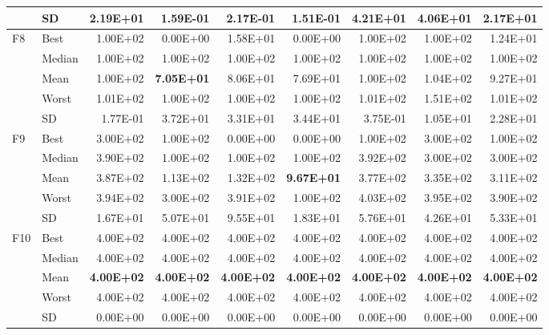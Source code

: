 \documentclass[algorithms,article,submit,moreauthors,pdftex]{Definitions/mdpi}
\newcommand{\bestval}[1]{\textbf{#1}}
\begin{document}
\begin{table}[p]
{\begin{tabular}{llrrrrrrr}
 & SD & 2.19E+01 & 1.59E-01 & 2.17E-01 & 1.51E-01 & 4.21E+01 & 4.06E+01 & 2.17E+01 \\
\midrule
F8 & Best & 1.00E+02 & 0.00E+00 & 1.58E+01 & 0.00E+00 & 1.00E+02 & 1.00E+02 & 1.24E+01 \\
 & Median & 1.00E+02 & 1.00E+02 & 1.00E+02 & 1.00E+02 & 1.00E+02 & 1.00E+02 & 1.00E+02 \\
 & Mean & 1.00E+02 & \bestval{7.05E+01} & 8.06E+01 & 7.69E+01 & 1.00E+02 & 1.04E+02 & 9.27E+01 \\
 & Worst & 1.01E+02 & 1.00E+02 & 1.00E+02 & 1.00E+02 & 1.01E+02 & 1.51E+02 & 1.01E+02 \\
 & SD & 1.77E-01 & 3.72E+01 & 3.31E+01 & 3.44E+01 & 3.75E-01 & 1.05E+01 & 2.28E+01 \\
\midrule
F9 & Best & 3.00E+02 & 1.00E+02 & 0.00E+00 & 0.00E+00 & 1.00E+02 & 3.00E+02 & 1.00E+02 \\
 & Median & 3.90E+02 & 1.00E+02 & 1.00E+02 & 1.00E+02 & 3.92E+02 & 3.00E+02 & 3.00E+02 \\
 & Mean & 3.87E+02 & 1.13E+02 & 1.32E+02 & \bestval{9.67E+01} & 3.77E+02 & 3.35E+02 & 3.11E+02 \\
 & Worst & 3.94E+02 & 3.00E+02 & 3.91E+02 & 1.00E+02 & 4.03E+02 & 3.95E+02 & 3.90E+02 \\
 & SD & 1.67E+01 & 5.07E+01 & 9.55E+01 & 1.83E+01 & 5.76E+01 & 4.26E+01 & 5.33E+01 \\
\midrule
F10 & Best & 4.00E+02 & 4.00E+02 & 4.00E+02 & 4.00E+02 & 4.00E+02 & 4.00E+02 & 4.00E+02 \\
 & Median & 4.00E+02 & 4.00E+02 & 4.00E+02 & 4.00E+02 & 4.00E+02 & 4.00E+02 & 4.00E+02 \\
 & Mean & \bestval{4.00E+02} & \bestval{4.00E+02} & \bestval{4.00E+02} & \bestval{4.00E+02} & \bestval{4.00E+02} & \bestval{4.00E+02} & \bestval{4.00E+02} \\
 & Worst & 4.00E+02 & 4.00E+02 & 4.00E+02 & 4.00E+02 & 4.00E+02 & 4.00E+02 & 4.00E+02 \\
 & SD & 0.00E+00 & 0.00E+00 & 0.00E+00 & 0.00E+00 & 0.00E+00 & 0.00E+00 & 0.00E+00 \\
\bottomrule
\end{tabular}}
\end{table}
\end{document}

